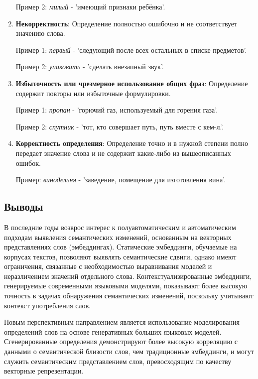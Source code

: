 \documentclass[LI,VKR]{HSEUniversity}
\begin{document}
\begin{enumerate}
Пример 2: \emph{милый} - ’имеющий признаки ребёнка’.

    \item \textbf{Некорректность}:
    Определение полностью ошибочно и не соответствует значению слова.

Пример 1: \emph{первый} - ’следующий после всех остальных в списке предметов’.

Пример 2: \emph{упаковать} - ’сделать внезапный звук’.

    \item \textbf{Избыточность или чрезмерное использование общих фраз}:
    Определение содержит повторы или избыточные формулировки.

Пример 1: \emph{пропан} - ’горючий газ, используемый для горения газа’.

Пример 2: \emph{спутник} - ’тот, кто совершает путь, путь вместе с кем-л.’.

    \item \textbf{Корректность определения}:
Определение точно и в нужной степени полно передает значение слова
и не содержит какие-либо из вышеописанных ошибок.

Пример: \emph{винодельня} - ’заведение, помещение для изготовления вина’.
\end{enumerate}

\subsection*{Выводы}

В последние годы возврос интерес к полуавтоматическим
и автоматическим подходам выявления семантических изменений,
основанным на векторных представлениях слов (эмбеддингах).
Статические эмбеддинги, обучаемые на корпусах текстов, позволяют выявлять семантические сдвиги,
однако имеют ограничения, связанные с необходимостью выравнивания моделей и неразличением значений
отдельного слова.
Контекстуализированные эмбеддинги, генерируемые современными языковыми моделями,
показывают более высокую точность в задачах обнаружения семантических изменений,
поскольку учитывают контекст употребления слов.

Новым перспективным направлением является использование моделирования определений слов
на основе генеративных больших языковых моделей.
Сгенерированные определения демонстрируют более высокую корреляцию с данными о семантической близости слов,
чем традиционные эмбеддинги, и могут служить семантическим представлением слов,
превосходящим по качеству векторные репрезентации.
\end{document}

